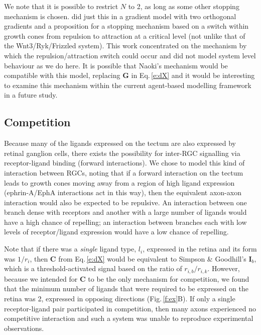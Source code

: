 \documentclass[9pt,lineno,draft]{elife}
\begin{document}
We note that it is possible to restrict $N$ to 2, as long as some other stopping mechanism is chosen.
\citet{naoki_revisiting_2017} did just this in a gradient model with two orthogonal gradients and a proposition for a stopping mechanism based on a switch within growth cones from repulsion to attraction at a critical level (not unlike that of the Wnt3/Ryk/Frizzled system).
This work concentrated on the mechanism by which the repulsion/attraction switch could occur and did not model system level behaviour as we do here.
It is possible that Naoki's mechanism would be compatible with this model, replacing $\mathbf{G}$ in Eq.\,\ref{e:dX} and it would be interesting to examine this mechanism within the current agent-based modelling framework in a future study.

\subsection*{Competition}

Because many of the ligands expressed on the tectum are also expressed by retinal ganglion cells, there exists the possibility for inter-RGC signalling via receptor-ligand binding (forward interactions).
We chose to model this kind of interaction between RGCs, noting that if a forward interaction on the tectum leads to growth cones moving away from a region of high ligand expression (ephrin-A/EphA interactions act in this way), then the equivalent axon-axon interaction would also be expected to be repulsive. An interaction between one branch dense with receptors and another with a large number of ligands would have a high chance of repelling; an interaction between branches each with low levels of receptor/ligand expression would have a low chance of repelling.

Note that if there was a \emph{single} ligand type, $l_i$, expressed in the retina and its form was $1/r_i$, then $\mathbf{C}$ from Eq.\,\ref{e:dX} would be equivalent to Simpson \& Goodhill's $\mathbf{I}_b$, which is a threshold-activated signal based on the ratio of $r_{i,b}/r_{i,k}$.
However, because we intended for $\mathbf{C}$ to be the only mechanism for competition, we found that the minimum number of ligands that were required to be expressed on the retina was 2, expressed in opposing directions (Fig.\,\ref{f:ex}B). If only a single receptor-ligand pair participated in competition, then many axons experienced no competitive interaction and such a system was unable to reproduce experimental observations.
\end{document}
